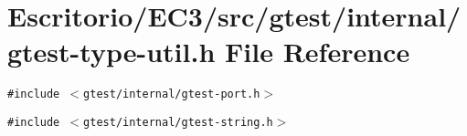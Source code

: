 \section{Escritorio/EC3/src/gtest/internal/gtest-type-util.h File Reference}
\label{gtest-type-util_8h}
{\tt \#include $<$gtest/internal/gtest-port.h$>$}\par
{\tt \#include $<$gtest/internal/gtest-string.h$>$}\par

